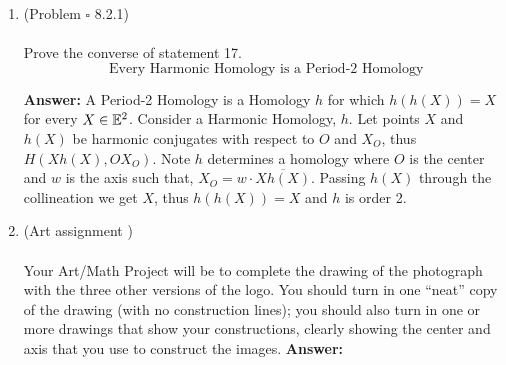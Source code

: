 \documentclass[12pt]{amsart}
\theoremstyle{remark}
\newcommand{\EE}{{\ensuremath\mathbb E}}
\theoremstyle{mycomment}
\begin{document}
\thispagestyle{fancy}

\begin{enumerate}

\item(Problem $\square$ 8.2.1)\\
\\
 Prove the converse of statement 17. 
 \begin{equation*}
\text{ Every Harmonic Homology is a Period-2 Homology}
\end{equation*}

\textbf{Answer:} A Period-2 Homology is a Homology $h$ for which $h(h(X)) = X$ for every $X \in \EE^2$. Consider a Harmonic Homology, $h$. Let points $X$ and $h(X)$ be harmonic conjugates with respect to $O$ and $X_O$, thus $H(Xh(X),OX_O)$. Note $h$ determines a homology where $O$ is the center and $w$ is the axis such that, $X_O = w \cdot \overline{Xh(X)}$. Passing $h(X)$ through the collineation we get $X$, thus $h(h(X)) = X$ and $h$ is order 2.




\vspace{1in}

\item(Art assignment )\\
\\
 Your Art/Math Project will be to complete the drawing of the photograph with the three other versions of the logo. You should turn in one “neat” copy of the drawing (with no construction lines); you should also turn in one or more drawings that show your constructions, clearly showing the center and axis that you use to construct the images.
\textbf{Answer:}
\vspace{1in}

\end{enumerate}
 
\end{document}
